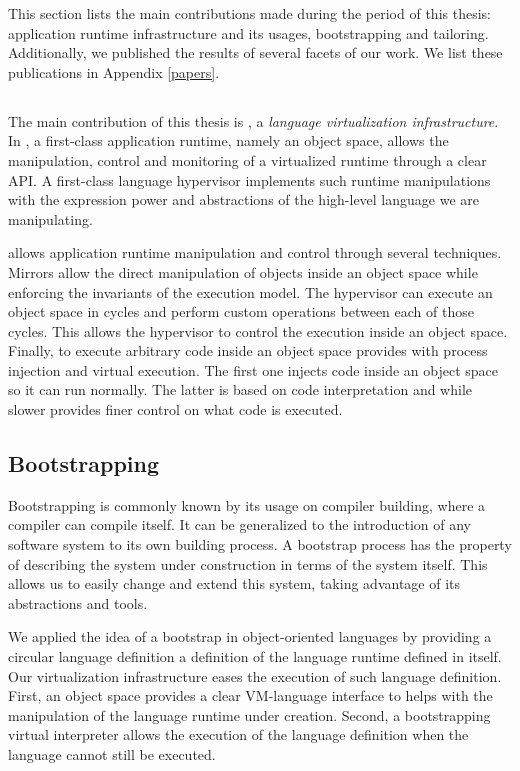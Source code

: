 This section lists the main contributions made during the period of this thesis: \Vtt application runtime infrastructure and its usages, bootstrapping and tailoring. Additionally, we published the results of several facets of our work. We list these publications in Appendix \ref{papers}.

\subsection{\Vtt}
The main contribution of this thesis is \Vtt, a \emph{language virtualization infrastructure}. In \Vtt, a first-class application runtime, namely an object space, allows the manipulation, control and monitoring of a virtualized runtime through a clear API. A first-class language hypervisor implements such runtime manipulations with the expression power and abstractions of the high-level language we are manipulating.

\Vtt allows application runtime manipulation and control through several techniques. Mirrors allow the direct manipulation of objects inside an object space while enforcing the invariants of the \VM execution model. The hypervisor can execute an object space in cycles and perform custom operations between each of those cycles. This allows the hypervisor to control the execution inside an object space. Finally, to execute arbitrary code inside an object space \Vtt provides with process injection and virtual execution. The first one injects code inside an object space so it can run normally. The latter is based on code interpretation and while slower provides finer control on what code is executed. 

\subsection{Bootstrapping}
Bootstrapping is commonly known by its usage on compiler building, where a compiler can compile itself.
It can be generalized to the introduction of any software system to its own building process.
A bootstrap process has the property of describing the system under construction in terms of the system itself. This allows us to easily change and extend this system, taking advantage of its abstractions and tools.

We applied the idea of a bootstrap in object-oriented languages by providing a circular language definition \ie a definition of the language runtime defined in itself.
Our virtualization infrastructure eases the execution of such language definition. First, an object space provides a clear VM-language interface to helps with the manipulation of the language runtime under creation. Second, a bootstrapping virtual interpreter allows the execution of the language definition when the language cannot still be executed.

